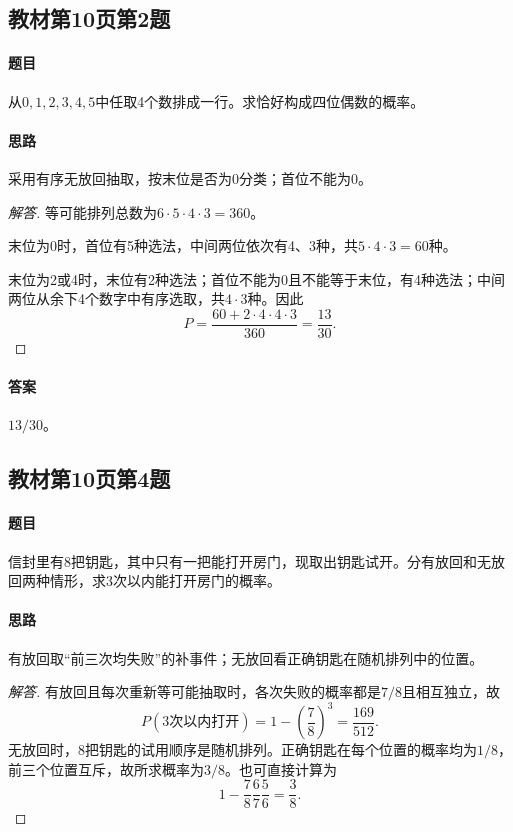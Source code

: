 \subsection{教材第10页第2题}\label{ex:w01-t2}
\paragraph{题目}
从$0,1,2,3,4,5$中任取4个数排成一行。求恰好构成四位偶数的概率。
\paragraph{思路}采用有序无放回抽取，按末位是否为0分类；首位不能为0。
\begin{proof}[解答]
等可能排列总数为$6\cdot5\cdot4\cdot3=360$。

末位为0时，首位有5种选法，中间两位依次有4、3种，共$5\cdot4\cdot3=60$种。

末位为2或4时，末位有2种选法；首位不能为0且不能等于末位，有4种选法；中间两位从余下4个数字中有序选取，共$4\cdot3$种。因此
\[P=\frac{60+2\cdot4\cdot4\cdot3}{360}=\frac{13}{30}.\]
\end{proof}
\paragraph{答案}$13/30$。

\subsection{教材第10页第4题}\label{ex:w01-t4}
\paragraph{题目}
信封里有8把钥匙，其中只有一把能打开房门，现取出钥匙试开。分有放回和无放回两种情形，求3次以内能打开房门的概率。
\paragraph{思路}有放回取“前三次均失败”的补事件；无放回看正确钥匙在随机排列中的位置。
\begin{proof}[解答]
有放回且每次重新等可能抽取时，各次失败的概率都是$7/8$且相互独立，故
\[P(\text{3次以内打开})=1-\left(\frac78\right)^3=\frac{169}{512}.\]
无放回时，8把钥匙的试用顺序是随机排列。正确钥匙在每个位置的概率均为$1/8$，前三个位置互斥，故所求概率为$3/8$。也可直接计算为
\[1-\frac78\frac67\frac56=\frac38.\]
\end{proof}
